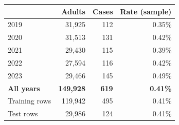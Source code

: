 \begin{tabular}{lrrr}
\toprule
 & Adults & Cases & Rate (sample) \\
\midrule
2019 & 31,925 & 112 & 0.35\% \\
2020 & 31,513 & 131 & 0.42\% \\
2021 & 29,430 & 115 & 0.39\% \\
2022 & 27,594 & 116 & 0.42\% \\
2023 & 29,466 & 145 & 0.49\% \\
\textbf{All years} & \textbf{149,928} & \textbf{619} & \textbf{0.41\%} \\
\midrule
Training rows & 119,942 & 495 & 0.41\% \\
Test rows & 29,986 & 124 & 0.41\% \\
\bottomrule
\end{tabular}
